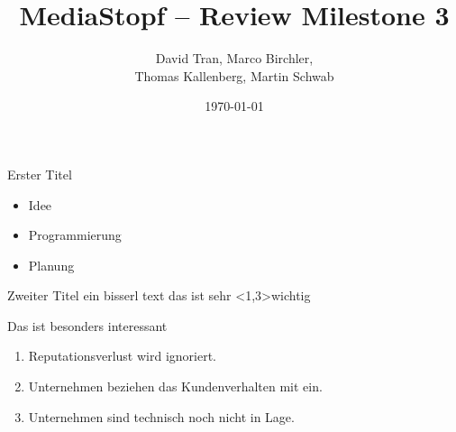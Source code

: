 \documentclass[]{beamer}
\title{MediaStopf -- Review Milestone 3}
\author{David Tran, Marco Birchler, \\ Thomas Kallenberg, Martin Schwab}
\institute{HSR Hochschule Rapperswil}
\date{ \today }
\begin{document}
\begin{frame}
  \titlepage
\end{frame}

\begin{frame}{Erster Titel}

\begin{itemize}[<+->]
\item Idee
\item Programmierung
\item Planung 
\end{itemize}

\end{frame}
\begin{frame}{Zweiter Titel}
ein bisserl text
das ist sehr \alert{<1,3>wichtig}
\begin{theorem}
Das ist besonders interessant
\end{theorem}

\begin{enumerate}
\item Reputationsverlust wird ignoriert.
\item Unternehmen beziehen das Kundenverhalten mit ein.
\item Unternehmen sind technisch noch nicht in Lage.
\end{enumerate}


\end{frame}
\end{document}
